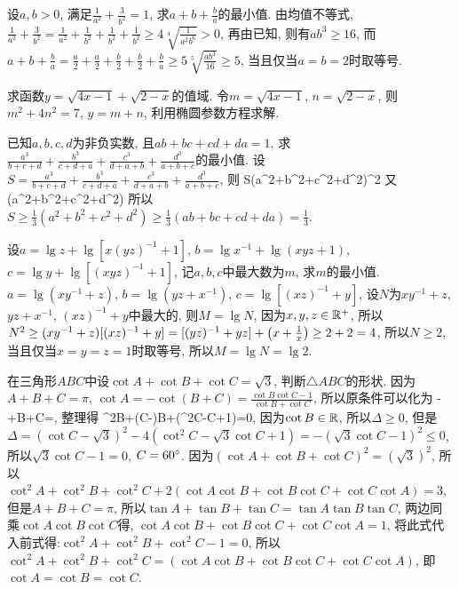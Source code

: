 \bq{}{}
设$a,b>0$, 满足$\frac{1}{a^{2}}+\frac{3}{b^{2}}=1$, 求$a+b+\frac{b}{a}$的最小值.
\eq
\ba
由均值不等式, $\frac{1}{a^{2}}+\frac{3}{b^{2}}=\frac{1}{a^{2}}+\frac{1}{b^{2}}+\frac{1}{b^{2}}+\frac{1}{b^{2}}\ge4\sqrt[4]{\frac{1}{a^{2}b^{6}}}>0$,
再由已知, 则有$ab^{3}\ge16$, 而$a+b+\frac{b}{a}=\frac{a}{2}+\frac{a}{2}+\frac{b}{2}+\frac{b}{2}+\frac{b}{a}\ge5\sqrt[5]{\frac{ab^{3}}{16}}\ge5$,
当且仅当$a=b=2$时取等号.
\ea

\bq{}{}
求函数$y=\sqrt{4x-1}+\sqrt{2-x}$的值域.
\eq
\ba
令$m=\sqrt{4x-1}$, $n=\sqrt{2-x}$, 则$m^{2}+4n^{2}=7$, $y=m+n$,
利用椭圆参数方程求解.
\ea

\bq{}{}
已知$a,b,c,d$为非负实数, 且$ab+bc+cd+da=1$, 求$\frac{a^{3}}{b+c+d}+\frac{b^{3}}{c+d+a}+\frac{c^{3}}{d+a+b}+\frac{d^{3}}{a+b+c}$的最小值.
\eq
\ba
设$S=\frac{a^{3}}{b+c+d}+\frac{b^{3}}{c+d+a}+\frac{c^{3}}{d+a+b}+\frac{d^{3}}{a+b+c}$,
则
\bee
[a(b+c+d)+b(c+d+a)+c(d+a+b)+d(a+b+c)]S\ge(a^{2}+b^{2}+c^{2}+d^{2})^{2}
\eee
又
\bee
[a(b+c+d)+b(c+d+a)+c(d+a+b)+d(a+b+c)](a^{2}+b^{2}+c^{2}+d^{2})
\eee
所以$S\ge\frac{1}{3}(a^{2}+b^{2}+c^{2}+d^{2})\ge\frac{1}{3}(ab+bc+cd+da)=\frac{1}{3}$.
\ea

\bq{}{}
设$a=\lg z+\lg[x(yz)^{-1}+1]$, $b=\lg x^{-1}+\lg(xyz+1)$, $c=\lg y+\lg[(xyz)^{-1}+1]$,
记$a,b,c$中最大数为$m$, 求$m$的最小值.
\eq
\ba
$a=\lg(xy^{-1}+z)$, $b=\lg(yz+x^{-1})$, $c=\lg[(xz)^{-1}+y]$, 设$N$为$xy^{-1}+z$,
$yz+x^{-1}$, $(xz)^{-1}+y$中最大的, 则$M=\lg N$, 因为$x,y,z\in\mathbb{R}^{+}$,
所以$N^{2}\ge(xy^{-1}+z)[(xz)^{-1}+y]=[(yz)^{-1}+yz]+\left(x+\frac{1}{x}\right)\ge2+2=4$,
所以$N\ge2$, 当且仅当$x=y=z=1$时取等号, 所以$M=\lg N=\lg2$.
\ea

\bq{}{}
在三角形$ABC$中设$\cot A+\cot B+\cot C=\sqrt{3}$, 判断$\triangle ABC$的形状.
\eq
\ba
因为$A+B+C=\pi$, $\cot A=-\cot(B+C)=\frac{\cot B\cot C-1}{\cot B+\cot C}$,
所以原条件可以化为
\bee
-+\cot B+\cot C=,
\eee
整理得
\bee
\cot^{2}B+(\cot C-)\cot B+(\cot^{2}C-\cot C+1)=0,
\eee
因为$\cot B\in\mathbb{R}$, 所以$\Delta\ge0$, 但是$\Delta=(\cot C-\sqrt{3})^{2}-4(\cot^{2}C-\sqrt{3}\cot C+1)=-(\sqrt{3}\cot C-1)^{2}\le0$,
所以$\sqrt{3}\cot C-1=0$, $C=60^\circ$.
\ea
\ba
因为$(\cot A+\cot B+\cot C)^{2}=(\sqrt{3})^{2}$, 所以$\cot^{2}A+\cot^{2}B+\cot^{2}C+2(\cot A\cot B+\cot B\cot C+\cot C\cot A)=3$,
但是$A+B+C=\pi$, 所以$\tan A+\tan B+\tan C=\tan A\tan B\tan C$, 两边同乘$\cot A\cot B\cot C$得,
$\cot A\cot B+\cot B\cot C+\cot C\cot A=1$, 将此式代入前式得:$\cot^{2}A+\cot^{2}B+\cot^{2}C-1=0$,
所以$\cot^{2}A+\cot^{2}B+\cot^{2}C=(\cot A\cot B+\cot B\cot C+\cot C\cot A)$,
即$\cot A=\cot B=\cot C$.
\ea

